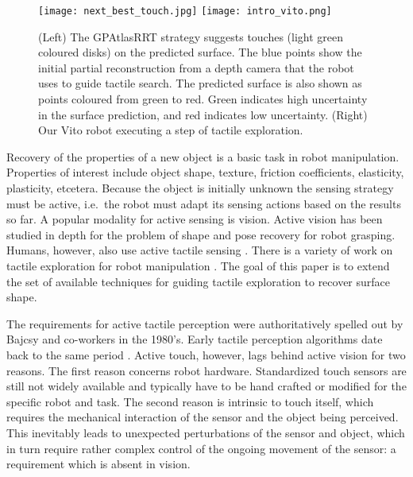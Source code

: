 \begin{figure*}
\centering
  \texttt{[image: next\_best\_touch.jpg]}
  \texttt{[image: intro\_vito.png]}
\caption{(Left) The GPAtlasRRT strategy suggests touches (light green coloured disks) on the predicted surface. The blue points show the initial partial reconstruction from a depth camera that the robot uses to guide tactile search. The predicted surface is also shown as points coloured from green to red. Green indicates high uncertainty in the surface prediction, and red indicates low uncertainty. (Right) Our Vito robot executing a step of tactile exploration.}
\label{fig:setup_solution}
\end{figure*}

Recovery of the properties of a new object is a basic task in robot manipulation. Properties of interest include object shape, texture, friction coefficients, elasticity, plasticity, etcetera. Because the object is initially unknown the sensing strategy must be active, i.e.\ the robot must adapt its sensing actions based on the results so far. A popular modality for active sensing is vision. Active vision has been studied in depth for the problem of shape and pose recovery for robot grasping\cite{Kragic2002TechRep,nunez2013models,arruda16,kopicki2015ijrr,kootstra2012a}. Humans, however, also use active tactile sensing \cite{johansson92}. There is a variety of work on tactile exploration for robot manipulation \cite{zito2013sequential,jentoft2014a,Bjorkman2013Enhancing,Hebert2013Next,Petrovskaya2011Global}. The goal of this paper is to extend the set of available techniques for guiding tactile exploration to recover surface shape.

The requirements for active tactile perception were authoritatively spelled out by Bajcsy and co-workers\cite{Bajcsy1988Active} in the 1980's. Early tactile perception algorithms date back to the same period \cite{Grimson1984JRR,Faugeras1983IJCAI,Shekhar1986ICRA,Bajcsy1989Machine}. Active touch, however, lags behind active vision for two reasons. The first reason concerns robot hardware. Standardized touch sensors are still not widely available and typically have to be hand crafted or modified for the specific robot and task. The second reason is intrinsic to touch itself, which requires the mechanical interaction of the sensor and the object being perceived. This inevitably leads to unexpected perturbations of the sensor and object, which in turn require rather complex control of the ongoing movement of the sensor: a requirement which is absent in vision.

